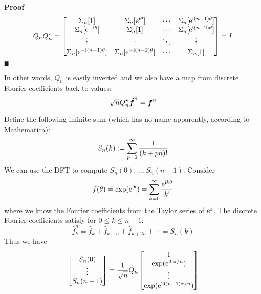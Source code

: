 \textbf{Proof}
\[
Q_n Q_n^\ensuremath{\star}  = \begin{bmatrix} \ensuremath{\Sigma}_n[1] & \ensuremath{\Sigma}_n[{\rm e}^{\I \ensuremath{\theta}}] & \ensuremath{\cdots} & \ensuremath{\Sigma}_n[{\rm e}^{\I (n-1) \ensuremath{\theta}}] \\
                            \ensuremath{\Sigma}_n[{\rm e}^{-\I \ensuremath{\theta}}] & \ensuremath{\Sigma}_n[1] & \ensuremath{\cdots} & \ensuremath{\Sigma}_n[{\rm e}^{\I (n-2) \ensuremath{\theta}}] \\
                            \ensuremath{\vdots} & \ensuremath{\vdots} & \ensuremath{\ddots} & \ensuremath{\vdots} \\
                            \ensuremath{\Sigma}_n[{\rm e}^{-\I(n-1) \ensuremath{\theta}}] & \ensuremath{\Sigma}_n[{\rm e}^{-\I(n-2) \ensuremath{\theta}}] & \ensuremath{\cdots} & \ensuremath{\Sigma}_n[1]
                            \end{bmatrix} = I
\]
\ensuremath{\QED}

In other words, $Q_n$ is easily inverted and we also have a map from discrete Fourier coefficients back to values:
\[
\sqrt{n} Q_n^\star {\mbox{\boldmath$\hat f$\unboldmath}}^n = \bm{{\mbox{\boldmath$f$\unboldmath}}}^n
\]
\begin{example} Define the following infinite sum (which has no name apparently, according to Mathematica):
\[
S_n(k) := \ensuremath{\sum}_{p=0}^\ensuremath{\infty} {1 \over (k+pn)!}
\]
We can use the DFT to compute $S_n(0), \ensuremath{\ldots}, S_n(n-1)$. Consider
\[
f(\theta) = \exp({\rm e}^{{\rm i} \theta}) = \sum_{k=0}^\infty {{\rm e}^{{\rm i}k \ensuremath{\theta}} \over k!}
\]
where we know the Fourier coefficients from the Taylor series of ${\rm e}^z$. The discrete Fourier coefficients satisfy for $0 \ensuremath{\leq} k \ensuremath{\leq} n-1$:
\[
\hat f_k^n = \hat f_k + \hat f_{k+n} + \hat f_{k+2n} + \ensuremath{\cdots} = S_n(k)
\]
Thus we have
\[
\begin{bmatrix}
S_n(0) \\
\vdots \\
S_n(n-1)
\end{bmatrix} = {1 \over \sqrt{n}} Q_n \begin{bmatrix} 1 \\
                                \exp({\rm e}^{2{\rm i} \pi/n}) \\
                                \vdots \\
                                \exp({\rm e}^{2{\rm i} (n-1) \pi/n}) \end{bmatrix}
\]
\end{example}

